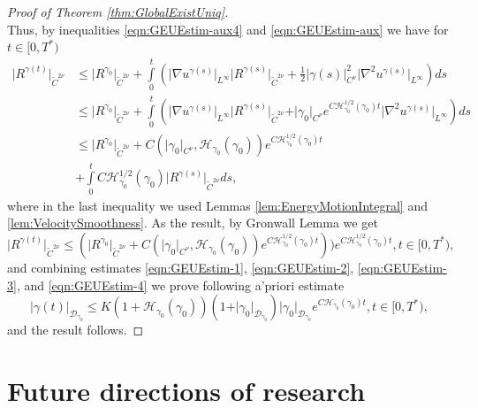 \documentclass[11pt,a4paper,leqno]{amsart}%
\theoremstyle{plain}
\theoremstyle{remark}
\theoremstyle{plain}
\numberwithin{equation}{section}
\def\intl{\int\limits}
\begin{document}
\begin{proof}[Proof of Theorem \ref{thm:GlobalExistUniq}]
\begin{equation}
\end{equation}
Thus, by inequalities \eqref{eqn:GEUEstim-aux4} and
\eqref{eqn:GEUEstim-aux} we have for $t\in[0,T^*)$
\begin{align}
\vert R^{\gamma(t)}\vert_{\tilde{C}^{2\nu}}&\leq\vert R^{\gamma_0}\vert_{\tilde{C}^{2\nu}}+\intl_0^t(\vert \nabla
u^{\gamma(s)}\vert_{L^{\infty}}\vert R^{\gamma(s)}\vert_{\tilde{C}^{2\nu}}+\frac{1}{2}\vert \gamma(s)\vert_{C^{\nu}}^2\vert \nabla^2
u^{\gamma(s)}\vert_{L^{\infty}})ds\nonumber\\
&\leq\vert R^{\gamma_0}\vert_{\tilde{C}^{2\nu}}+\intl_0^t(\vert \nabla
u^{\gamma(s)}\vert_{L^{\infty}}\vert R^{\gamma(s)}\vert_{\tilde{C}^{2\nu}}+\vert \gamma_0\vert_{C^{\nu}}e^{C\mathcal{H}_{\gamma_0}^{1/2}(\gamma_0)t}\vert \nabla^2
u^{\gamma(s)}\vert_{L^{\infty}})ds\nonumber\\
&\leq\vert R^{\gamma_0}\vert_{\tilde{C}^{2\nu}}+C(\vert \gamma_0\vert_{C^{\nu}},\mathcal{H}_{\gamma_0}(\gamma_0))e^{C\mathcal{H}_{\gamma_0}^{1/2}(\gamma_0)t}\nonumber\\
&+\intl_0^tC\mathcal{H}_{\gamma_0}^{1/2}(\gamma_0)\vert R^{\gamma(s)}\vert_{\tilde{C}^{2\nu}}ds,\label{eqn:GEUEstim-aux5}
\end{align}
where in the last inequality we used Lemmas
\ref{lem:EnergyMotionIntegral} and \ref{lem:VelocitySmoothness}.
As the result, by Gronwall Lemma we get
\begin{equation}
\vert R^{\gamma(t)}\vert_{\tilde{C}^{2\nu}}\leq(\vert R^{\gamma_0}\vert_{\tilde{C}^{2\nu}}+C(\vert \gamma_0\vert_{C^{\nu}},\mathcal{H}_{\gamma_0}(\gamma_0))e^{C\mathcal{H}_{\gamma_0}^{1/2}(\gamma_0)t}))
e^{C\mathcal{H}_{\gamma_0}^{1/2}(\gamma_0)t},t\in[0,T^*),\label{eqn:GEUEstim-4}
\end{equation}
and combining estimates \eqref{eqn:GEUEstim-1},
\eqref{eqn:GEUEstim-2}, \eqref{eqn:GEUEstim-3}, and
\eqref{eqn:GEUEstim-4} we prove following a'priori estimate
\begin{equation}
\vert \gamma(t)\vert_{\mathcal{D}_{\gamma_0}}\leq
K(1+\mathcal{H}_{\gamma_0}(\gamma_0))(1+\vert \gamma_0\vert_{\mathcal{D}_{\gamma_0}})\vert \gamma_0\vert_{\mathcal{D}_{\gamma_0}}e^{C\mathcal{H}_{\gamma_0}(\gamma_0)t},t\in[0,T^*),\label{eqn:GEUEstim-5}
\end{equation}
and the result follows.
\end{proof}

\section{Future directions of research}
\end{document}
